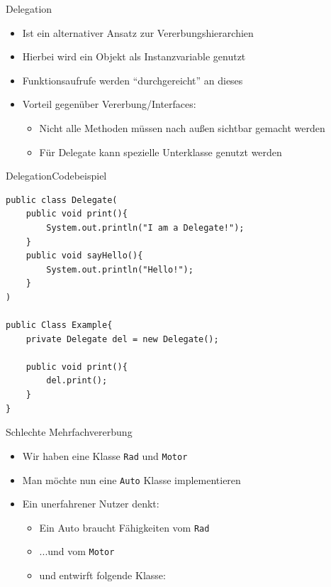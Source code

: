 \begin{frame}{Delegation}
    \begin{itemize}
        \item Ist ein alternativer Ansatz zur Vererbungshierarchien
        \item Hierbei wird ein Objekt als Instanzvariable genutzt
        \item Funktionsaufrufe werden "`durchgereicht"' an dieses
        \item Vorteil gegenüber Vererbung/Interfaces:
        \begin{itemize}
            \item Nicht alle Methoden müssen nach außen sichtbar gemacht werden
            \item Für Delegate kann spezielle Unterklasse genutzt werden
        \end{itemize}
    \end{itemize}
\end{frame}

\begin{frame}[fragile]{Delegation}{Codebeispiel}
\lstset{style=java}
\begin{lstlisting}
public class Delegate(
    public void print(){
        System.out.println("I am a Delegate!");
    }    
    public void sayHello(){
        System.out.println("Hello!");
    }
)

public Class Example{
    private Delegate del = new Delegate();
    
    public void print(){
        del.print();
    }
}
\end{lstlisting}
\end{frame}

\begin{frame}{Schlechte Mehrfachvererbung}
    \begin{itemize}
        \item Wir haben eine Klasse \texttt{Rad} und \texttt{Motor}
        \item Man möchte nun eine \texttt{Auto} Klasse implementieren
        \item Ein unerfahrener Nutzer denkt:
        \begin{itemize}
            \item Ein Auto braucht Fähigkeiten vom \texttt{Rad}
            \item ...und vom \texttt{Motor}
            \item und entwirft folgende Klasse:
        \end{itemize}
    \end{itemize}
\end{frame}

